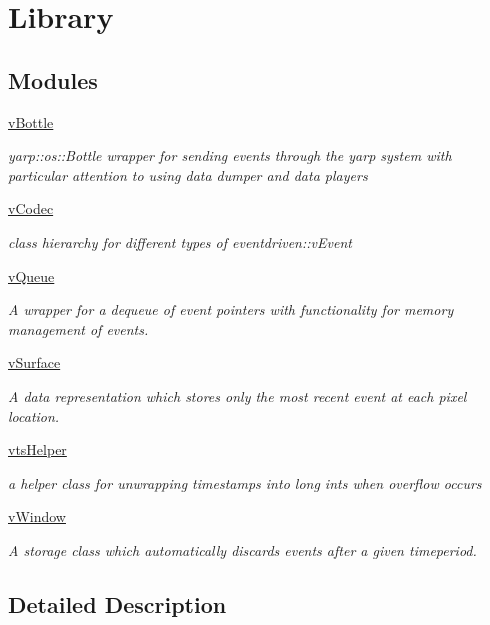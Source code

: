 \hypertarget{group__Library}{}\section{Library}
\label{group__Library}
\subsection*{Modules}
\begin{DoxyCompactItemize}
\item 
\hyperlink{group__vBottle}{v\+Bottle}
\begin{DoxyCompactList}\small\item\em yarp\+::os\+::\+Bottle wrapper for sending events through the yarp system with particular attention to using data dumper and data players \end{DoxyCompactList}\item 
\hyperlink{group__vCodec}{v\+Codec}
\begin{DoxyCompactList}\small\item\em class hierarchy for different types of eventdriven\+::v\+Event \end{DoxyCompactList}\item 
\hyperlink{group__vQueue}{v\+Queue}
\begin{DoxyCompactList}\small\item\em A wrapper for a dequeue of event pointers with functionality for memory management of events. \end{DoxyCompactList}\item 
\hyperlink{group__vSurface}{v\+Surface}
\begin{DoxyCompactList}\small\item\em A data representation which stores only the most recent event at each pixel location. \end{DoxyCompactList}\item 
\hyperlink{group__vtsHelper}{vts\+Helper}
\begin{DoxyCompactList}\small\item\em a helper class for unwrapping timestamps into long ints when overflow occurs \end{DoxyCompactList}\item 
\hyperlink{group__vWindow}{v\+Window}
\begin{DoxyCompactList}\small\item\em A storage class which automatically discards events after a given timeperiod. \end{DoxyCompactList}\end{DoxyCompactItemize}


\subsection{Detailed Description}
